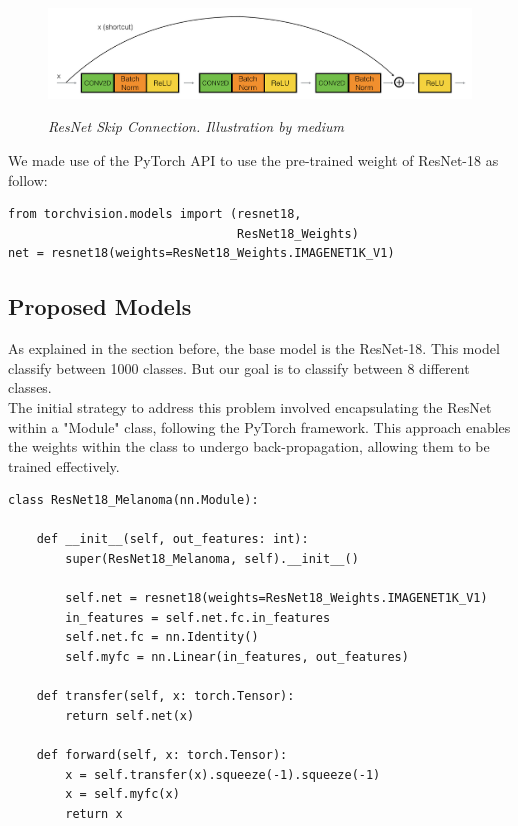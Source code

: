\begin{figure}[H]
  \centering
  \includegraphics[width=\textwidth]{imatges/methodological_contribution/skip-connections.png}
  \caption[ResNet Skip Connection]{\textit{ResNet Skip Connection. Illustration by medium}}
  {\label{fig:skip-connection}}
\end{figure}

We made use of the PyTorch API to use the pre-trained weight of ResNet-18 as follow:

\begin{Verbatim}[fontsize=\scriptsize]
from torchvision.models import (resnet18,
                                ResNet18_Weights)
net = resnet18(weights=ResNet18_Weights.IMAGENET1K_V1)
\end{Verbatim}

\subsection{Proposed Models}

As explained in the section before, the base model is the ResNet-18. This
model classify between 1000 classes. But our goal is to classify between 8
different classes. \\

The initial strategy to address this problem involved encapsulating the ResNet
within a "Module" class, following the PyTorch framework. This approach enables
the weights within the class to undergo back-propagation, allowing them to be
trained effectively.

\begin{Verbatim}[fontsize=\scriptsize]
class ResNet18_Melanoma(nn.Module):

    def __init__(self, out_features: int):
        super(ResNet18_Melanoma, self).__init__()

        self.net = resnet18(weights=ResNet18_Weights.IMAGENET1K_V1)
        in_features = self.net.fc.in_features
        self.net.fc = nn.Identity()
        self.myfc = nn.Linear(in_features, out_features)

    def transfer(self, x: torch.Tensor):
        return self.net(x)

    def forward(self, x: torch.Tensor):
        x = self.transfer(x).squeeze(-1).squeeze(-1)
        x = self.myfc(x)
        return x
\end{Verbatim}


